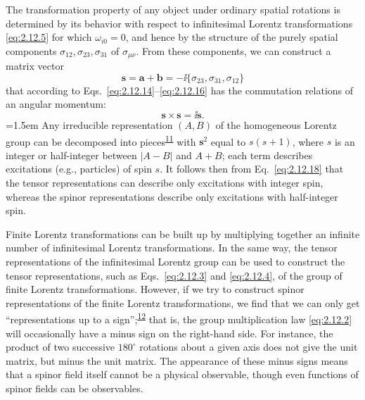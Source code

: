 The transformation property of any object under ordinary spatial rotations is
determined by its behavior with respect to infinitesimal Lorentz transformations
\eqref{eq:2.12.5} for which \(\omega_{i0}=0\), and hence by the structure of
the purely spatial components \(\sigma_{12},\sigma_{23},\sigma_{31}\) of
\(\sigma_{\mu\nu}\). From these components, we can construct a matrix vector
\begin{equation}
  \mathbf s=\mathbf a+\mathbf b
  =-\ii\{\sigma_{23},\sigma_{31},\sigma_{12}\}
  \tag{2.12.18}\label{eq:2.12.18}
\end{equation}
that according to Eqs.~\eqref{eq:2.12.14}--\eqref{eq:2.12.16} has the
commutation relations of an angular momentum:
\begin{equation}
  \mathbf s\times\mathbf s=\ii\mathbf s .
  \tag{2.12.19}\label{eq:2.12.19}
\end{equation}
\begingroup
\emergencystretch=1.5em
Any irreducible representation \((A,B)\) of the homogeneous Lorentz group can
be decomposed into pieces\textsuperscript{\hyperref[ch2-ref-11]{11}} with
\(\mathbf s^2\) equal to \(s(s+1)\), where \(s\) is an integer or
half-integer between \(\lvert A-B\rvert\) and \(A+B\); each term describes
excitations (e.g., particles) of spin \(s\). It follows then from
Eq.~\eqref{eq:2.12.18} that the tensor representations can describe only
excitations with integer spin, whereas the spinor representations describe only
excitations with half-integer spin.
\par
\endgroup

Finite Lorentz transformations can be built up by multiplying together an
infinite number of infinitesimal Lorentz transformations. In the same way, the
tensor representations of the infinitesimal Lorentz group can be used to
construct the tensor representations, such as Eqs.~\eqref{eq:2.12.3} and
\eqref{eq:2.12.4}, of the group of finite Lorentz transformations. However,
if we try to construct spinor representations of the finite Lorentz
transformations, we find that we can only get ``representations up to a
sign'';\textsuperscript{\hyperref[ch2-ref-12]{12}} that is, the group
multiplication law \eqref{eq:2.12.2} will occasionally have a minus sign on
the right-hand side. For instance, the product of two successive
\(180^\circ\) rotations about a given axis does not give the unit matrix, but
minus the unit matrix. The appearance of these minus signs means that a spinor
field itself cannot be a physical observable, though even functions of spinor
fields can be observables.
